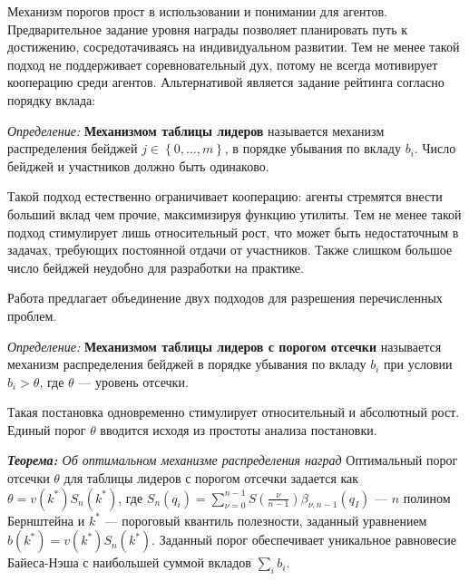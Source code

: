 Механизм порогов прост в использовании и понимании для агентов. Предварительное задание уровня награды позволяет
планировать путь к достижению, сосредотачиваясь на индивидуальном развитии. Тем не менее 
такой подход не поддерживает соревновательный дух, потому не всегда мотивирует кооперацию среди агентов.
Альтернативой является задание рейтинга согласно порядку вклада:

\textit{Определение:} \textbf{Механизмом таблицы лидеров} называется механизм распределения бейджей  $j \in \left\{0,\dots,m\right\}$,
в порядке убывания по вкладу $b_i$. Число бейджей и участников должно быть одинаково.

Такой подход естественно ограничивает кооперацию: агенты стремятся внести больший вклад чем прочие, максимизируя функцию утилиты.
Тем не менее такой подход стимулирует лишь относительный рост, что может быть недостаточным в задачах, требующих постоянной отдачи от участников. 
Также слишком большое число бейджей неудобно для разработки на практике. 

Работа \cite{Easley2013} предлагает объединение двух подходов для разрешения перечисленных проблем.

\textit{Определение:} \textbf{Механизмом таблицы лидеров с порогом отсечки} называется механизм распределения бейджей
в порядке убывания по вкладу $b_i$ при условии $b_i > \theta$, где $\theta$ --- уровень отсечки.

Такая постановка одновременно стимулирует относительный и абсолютный рост. Единый порог $\theta$ вводится исходя из простоты
анализа постановки. 

\textit{\textbf{Теорема:} Об оптимальном механизме распределения наград} \cite{Easley2013} Оптимальный порог отсечки $\theta$ для таблицы лидеров с порогом отсечки задается как $\theta=v(k^*) S_n(k^*)$,
где $S_n(q_i) = \sum_{\nu=0}^{n-1} S\left(\frac{\nu}{n-1}\right) \beta_{\nu,n-1} (q_I)$ --- $n$ полином Бернштейна и $k^*$ --- пороговый 
квантиль полезности, заданный уравнением $b(k^*) = v(k^*) S_n(k^*)$. Заданный порог обеспечивает уникальное равновесие Байеса-Нэша
с наибольшей суммой вкладов $\sum_i b_i$.